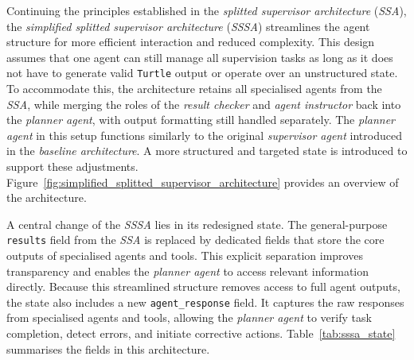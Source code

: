 \documentclass[a4paper,oneside,bibliography=totoc]{scrbook}
\begin{document}
Continuing the principles established in the \textit{splitted supervisor architecture} (\textit{\ac{SSA}}), the \textit{simplified splitted supervisor architecture} (\textit{\ac{SSSA}}) streamlines the agent structure for more efficient interaction and reduced complexity. This design assumes that one agent can still manage all supervision tasks as long as it does not have to generate valid \texttt{Turtle} output or operate over an unstructured state. To accommodate this, the architecture retains all specialised agents from the \textit{\ac{SSA}}, while merging the roles of the \textit{result checker} and \textit{agent instructor} back into the \textit{planner agent}, with output formatting still handled separately. The \textit{planner agent} in this setup functions similarly to the original \textit{supervisor agent} introduced in the \textit{baseline architecture}. A more structured and targeted state is introduced to support these adjustments. Figure~\ref{fig:simplified_splitted_supervisor_architecture} provides an overview of the architecture.

A central change of the \textit{\ac{SSSA}} lies in its redesigned state. The general-purpose \texttt{results} field from the \textit{\ac{SSA}} is replaced by dedicated fields that store the core outputs of specialised agents and tools. This explicit separation improves transparency and enables the \textit{planner agent} to access relevant information directly. Because this streamlined structure removes access to full agent outputs, the state also includes a new \texttt{agent\_response} field. It captures the raw responses from specialised agents and tools, allowing the \textit{planner agent} to verify task completion, detect errors, and initiate corrective actions. Table~\ref{tab:sssa_state} summarises the fields in this architecture.
\end{document}
